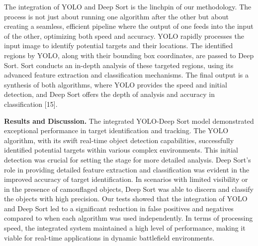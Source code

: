 The integration of YOLO and Deep Sort is the linchpin of our
methodology. The process is not just about running one algorithm after
the other but about creating a seamless, efficient pipeline where the
output of one feeds into the input of the other, optimizing both speed
and accuracy. YOLO rapidly processes the input image to identify
potential targets and their locations. The identified regions by YOLO,
along with their bounding box coordinates, are passed to Deep Sort. Sort
conducts an in-depth analysis of these targeted regions, using its
advanced feature extraction and classification mechanisms. The final
output is a synthesis of both algorithms, where YOLO provides the speed
and initial detection, and Deep Sort offers the depth of analysis and
accuracy in classification {[}15{]}.

{\bfseries Results and Discussion.} The integrated YOLO-Deep Sort model
demonstrated exceptional performance in target identification and
tracking. The YOLO algorithm, with its swift real-time object detection
capabilities, successfully identified potential targets within various
complex environments. This initial detection was crucial for setting the
stage for more detailed analysis. Deep Sort's role in providing detailed
feature extraction and classification was evident in the improved
accuracy of target identification. In scenarios with limited visibility
or in the presence of camouflaged objects, Deep Sort was able to discern
and classify the objects with high precision. Our tests showed that the
integration of YOLO and Deep Sort led to a significant reduction in
false positives and negatives compared to when each algorithm was used
independently. In terms of processing speed, the integrated system
maintained a high level of performance, making it viable for real-time
applications in dynamic battlefield environments.

